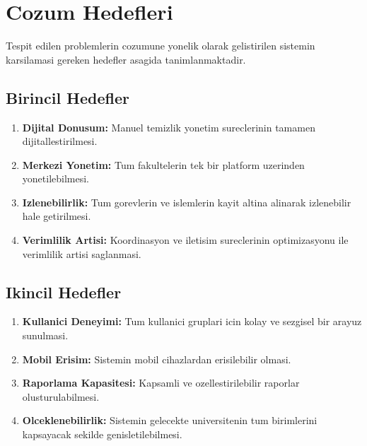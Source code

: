 \section{Cozum Hedefleri}
\label{sec:cozum-hedefleri}

Tespit edilen problemlerin cozumune yonelik olarak gelistirilen 
sistemin karsilamasi gereken hedefler asagida tanimlanmaktadir.

\subsection{Birincil Hedefler}
\label{subsec:birincil-hedefler}

\begin{enumerate}
    \item \textbf{Dijital Donusum:} Manuel temizlik yonetim 
    sureclerinin tamamen dijitallestirilmesi.
    
    \item \textbf{Merkezi Yonetim:} Tum fakultelerin tek bir 
    platform uzerinden yonetilebilmesi.
    
    \item \textbf{Izlenebilirlik:} Tum gorevlerin ve islemlerin 
    kayit altina alinarak izlenebilir hale getirilmesi.
    
    \item \textbf{Verimlilik Artisi:} Koordinasyon ve iletisim 
    sureclerinin optimizasyonu ile verimlilik artisi saglanmasi.
\end{enumerate}

\subsection{Ikincil Hedefler}
\label{subsec:ikincil-hedefler}

\begin{enumerate}
    \item \textbf{Kullanici Deneyimi:} Tum kullanici gruplari icin 
    kolay ve sezgisel bir arayuz sunulmasi.
    
    \item \textbf{Mobil Erisim:} Sistemin mobil cihazlardan 
    erisilebilir olmasi.
    
    \item \textbf{Raporlama Kapasitesi:} Kapsamli ve ozellestirilebilir 
    raporlar olusturulabilmesi.
    
    \item \textbf{Olceklenebilirlik:} Sistemin gelecekte universitenin 
    tum birimlerini kapsayacak sekilde genisletilebilmesi.
\end{enumerate}

